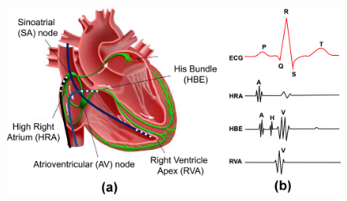 \begin{figure}[!t]
\centering
		\includegraphics[width=0.9  \textwidth]{figs/probes.png}
		
\caption{\small }
\label{fig:egm}
\end{figure} 

